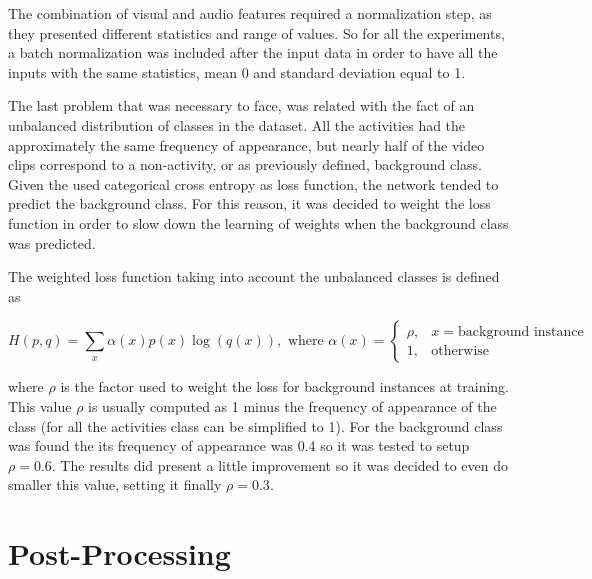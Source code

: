 The combination of visual and audio features required a normalization step, as they presented different statistics and range of values. 
So for all the experiments, a batch normalization\cite{ioffe2015batch} was included after the input data in order to have all the inputs with the same statistics, mean 0 and standard deviation equal to 1. 

The last problem that was necessary to face, was related with the fact of an unbalanced distribution of classes in the dataset. All the activities had the approximately the same frequency of appearance, but nearly half of the video clips correspond to a non-activity, or as previously defined, background class.
Given the used categorical cross entropy as loss function, the network tended to predict the background class. For this reason, it was decided to weight the loss function in order to slow down the learning of weights when the background class was predicted. %

The weighted loss function taking into account the unbalanced classes is defined as

\begin{equation}
	H(p,q) = \sum_x \alpha(x) p(x) \log (q(x)), \text{ where } \alpha(x) = 
    \begin{cases}
        \rho, & x = \text{background instance}\\
        1,    & \text{otherwise}
    \end{cases}
\end{equation}

where $\rho$ is the factor used to weight the loss for background instances at training. This value $\rho$ is usually computed as 1 minus the frequency of appearance of the class (for all the activities class can be simplified to 1). For the background class was found the its frequency of appearance was 0.4 so it was tested to setup $\rho = 0.6$. The results did present a little improvement so it was decided to even do smaller this value, setting it finally $\rho = 0.3$.

\section{Post-Processing}
\label{section:post_processing}

